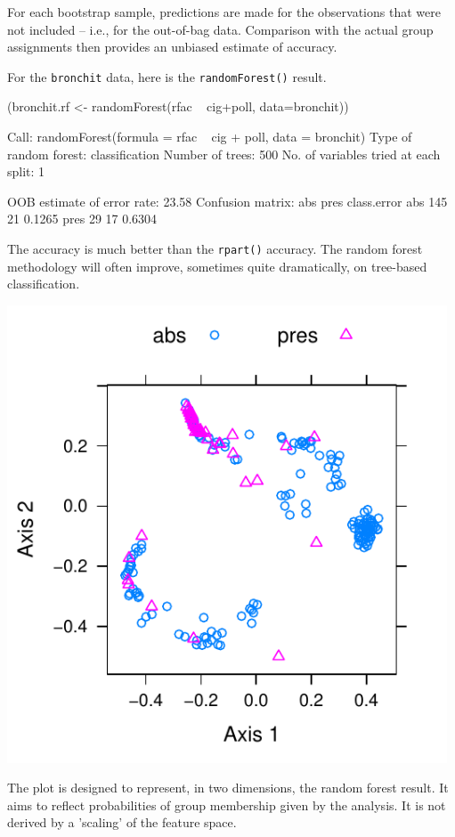 For each bootstrap sample, predictions are made for the observations
that were not included -- i.e., for the out-of-bag data.  Comparison
with the actual group assignments then provides an unbiased estimate
of accuracy.

For the \texttt{bronchit} data, here is the \texttt{randomForest()}
result.
\begin{Schunk}
\begin{Sinput}
(bronchit.rf <- randomForest(rfac ~ cig+poll,
                             data=bronchit))
\end{Sinput}
\begin{Soutput}

Call:
 randomForest(formula = rfac ~ cig + poll, data = bronchit) 
               Type of random forest: classification
                     Number of trees: 500
No. of variables tried at each split: 1

        OOB estimate of  error rate: 23.58%
Confusion matrix:
     abs pres class.error
abs  145   21      0.1265
pres  29   17      0.6304
\end{Soutput}
\end{Schunk}
The accuracy is much better than the \texttt{rpart()} accuracy.  The
random forest methodology will often improve, sometimes quite
dramatically, on tree-based classification.

\begin{marginfigure}
\begin{Schunk}


\centerline{\includegraphics[width=0.98\textwidth]{figs/9-proximity-plot-1} }

\end{Schunk}
\caption{The plot is designed to represent, in two dimensions, the random
  forest result. It aims to reflect probabilities of group membership
  given by the analysis.  It is not derived by a 'scaling' of the
  feature space.
}\label{fig:rfbronchit}
\end{marginfigure}

